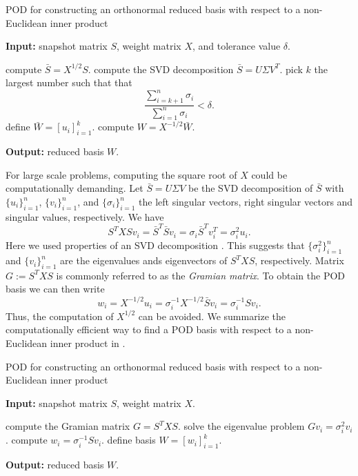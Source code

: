 \begin{algorithm} 
	\caption{POD for constructing an orthonormal reduced basis with respect to a non-Euclidean inner product} \label{alg:3.2}
	\textbf{Input:} snapshot matrix $S$, weight matrix $X$, and tolerance value $\delta$.
	\begin{algorithmic} [1]
		\State compute $\bar S = X^{1/2} S$.
		\State compute the SVD decomposition $\bar S = U \Sigma V^T$.
		\State pick $k$ the largest number such that that
		\[
			\frac{\sum_{i=k+1}^n \sigma_i}{\sum_{i=1}^n \sigma_i} < \delta.
		\]
		\State define $\bar W = [u_i]_{i=1}^k$.
		\State compute $W = X^{-1/2} \bar W$.
	\end{algorithmic}
	\vspace{0.5cm}
	\textbf{Output:} reduced basis $W$.
\end{algorithm}
For large scale problems, computing the square root of $X$ could be computationally demanding. Let $\bar S = U\Sigma V$ be the SVD decomposition of $\bar S$ with $\{u_i\}_{i=1}^{n}$, $\{v_i\}_{i=1}^{n}$, and $\{ \sigma_i \}_{i=1}^n$ the left singular vectors, right singular vectors and singular values, respectively. We have
\begin{equation} \label{eq:3.23}
	S^TXS v_i = \bar S^T \bar S v_i = \sigma_i \bar S^T v_i^T = \sigma_i^2 u_i. 
\end{equation}
Here we used properties of an SVD decomposition \cite{trefethen97}. This suggests that $\{\sigma_i^2\}_{i=1}^{n}$ and $\{v_i\}_{i=1}^n$ are the eigenvalues ands eigenvectors of $S^TXS$, respectively. Matrix $G:=S^TXS$ is commonly referred to as the \emph{Gramian matrix}. To obtain the POD basis we can then write
\begin{equation} \label{eq:3.24}
	w_i = X^{-1/2} u_i = \sigma_i^{-1} X^{-1/2} \bar S v_i = \sigma_i^{-1} S v_i.
\end{equation}
Thus, the computation of $X^{1/2}$ can be avoided. We summarize the computationally efficient way to find a POD basis with respect to a non-Euclidean inner product in .

\begin{algorithm} 
	\caption{POD for constructing an orthonormal reduced basis with respect to a non-Euclidean inner product} \label{alg:3.3}
	\textbf{Input:} snapshot matrix $S$, weight matrix $X$.
	\begin{algorithmic} [1]
		\State compute the Gramian matrix $ G = S^TXS$.
		\State solve the eigenvalue problem $Gv_i = \sigma_i^2 v_i$. 
		\State compute $w_i = \sigma_i^{-1} S v_i$.
		\State define basis $W = [w_i]_{i=1}^k$.
	\end{algorithmic}
	\vspace{0.5cm}
	\textbf{Output:} reduced basis $W$.
\end{algorithm}


